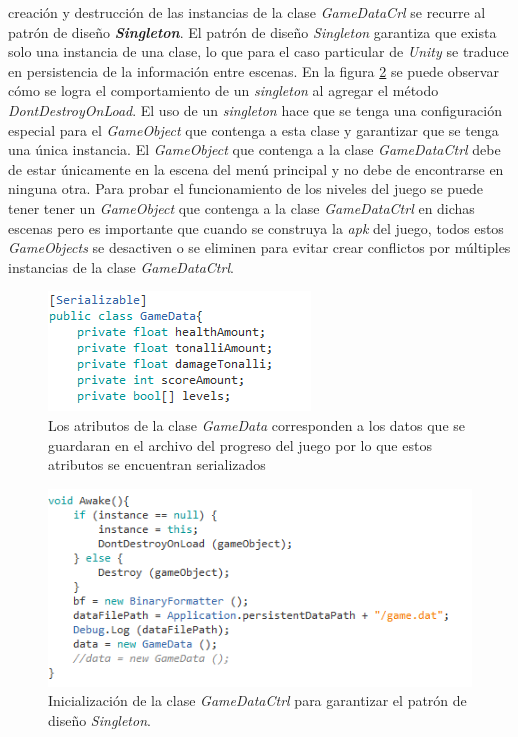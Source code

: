 creación y destrucción de las instancias de la clase \textit{GameDataCrl} se
recurre al patrón de diseño\textbf{ \textit{Singleton}}. El patrón de diseño
\textit{Singleton} garantiza que exista solo una instancia de una clase, lo que
para el caso particular de \textit{Unity} se traduce en persistencia de la
información entre escenas. En la figura \ref{fig:GameDataCtrl} se puede observar
cómo se logra el comportamiento de un \textit{singleton} al agregar el método
\textit{DontDestroyOnLoad}. El uso de un \textit{singleton} hace que se tenga una
configuración especial para el \textit{GameObject} que contenga a esta clase y
garantizar que se tenga una única instancia. El \textit{GameObject} que contenga
a la clase \textit{GameDataCtrl} debe de estar únicamente en la escena del menú
principal y no debe de encontrarse en ninguna otra. Para probar el
funcionamiento de los niveles del juego se puede tener tener un
\textit{GameObject} que contenga a la clase \textit{GameDataCtrl} en dichas
escenas pero es importante que cuando se construya la \textit{apk} del juego,
todos estos \textit{GameObjects} se desactiven o se eliminen para evitar crear
conflictos por múltiples instancias de la clase \textit{GameDataCtrl}.  

    \begin{figure}[h]
        \centering
        \includegraphics[height=0.15 \textheight]{03TrabajoRealizado/imagenes/GameData.png}
        \caption{Los atributos de la clase \textit{GameData} corresponden a los
        datos que se guardaran en el archivo del progreso del juego por lo que
        estos atributos se encuentran serializados}
        \label{fig:GameData}
    \end{figure}   
    
    \begin{figure}[h]
        \centering
        \includegraphics[height=0.2 \textheight]{03TrabajoRealizado/imagenes/gameDataCtrl.png}
        \caption{Inicialización de la clase \textit{GameDataCtrl} para
        garantizar el patrón de diseño \textit{Singleton}.}
        \label{fig:GameDataCtrl}
    \end{figure}

